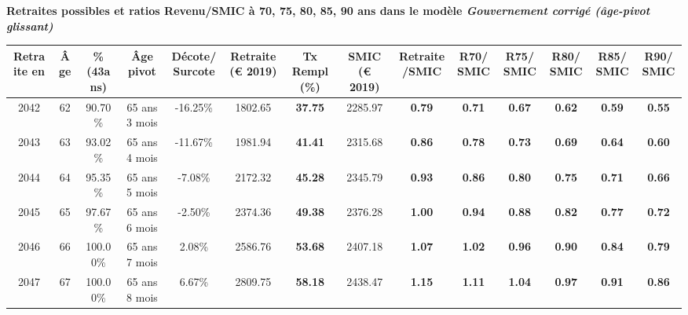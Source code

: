  \vspace{0.1cm} 
{\bf \noindent Retraites possibles et ratios Revenu/SMIC à 70, 75, 80, 85, 90 ans dans le modèle \emph{Gouvernement corrigé (âge-pivot glissant)}}  
 
\begin{adjustbox}{max width=\textwidth} 
\begin{tabular}[htb]{|c|c||c|c|c||c|c||c|c||c|c|c|c|c|} 
\hline 
 Retraite en &  Âge &  \%(43ans) &  Âge pivot &  Décote/Surcote &  Retraite (\euro{} 2019) &  Tx Rempl(\%) &  SMIC (\euro{} 2019) &  Retraite/SMIC &  R70/SMIC &  R75/SMIC &  R80/SMIC &  R85/SMIC &  R90/SMIC \\ 
\hline \hline 
 2042 &  62 &  90.70\% &  65 ans 3 mois &  -16.25\% &  1802.65 &  {\bf 37.75} &  2285.97 &  {\bf {\color{red} 0.79}} &  {\bf {\color{red} 0.71}} &  {\bf {\color{red} 0.67}} &  {\bf {\color{red} 0.62}} &  {\bf {\color{red} 0.59}} &  {\bf {\color{red} 0.55}} \\ 
\hline 
 2043 &  63 &  93.02\% &  65 ans 4 mois &  -11.67\% &  1981.94 &  {\bf 41.41} &  2315.68 &  {\bf {\color{red} 0.86}} &  {\bf {\color{red} 0.78}} &  {\bf {\color{red} 0.73}} &  {\bf {\color{red} 0.69}} &  {\bf {\color{red} 0.64}} &  {\bf {\color{red} 0.60}} \\ 
\hline 
 2044 &  64 &  95.35\% &  65 ans 5 mois &  -7.08\% &  2172.32 &  {\bf 45.28} &  2345.79 &  {\bf {\color{red} 0.93}} &  {\bf {\color{red} 0.86}} &  {\bf {\color{red} 0.80}} &  {\bf {\color{red} 0.75}} &  {\bf {\color{red} 0.71}} &  {\bf {\color{red} 0.66}} \\ 
\hline 
 2045 &  65 &  97.67\% &  65 ans 6 mois &  -2.50\% &  2374.36 &  {\bf 49.38} &  2376.28 &  {\bf {\color{red} 1.00}} &  {\bf {\color{red} 0.94}} &  {\bf {\color{red} 0.88}} &  {\bf {\color{red} 0.82}} &  {\bf {\color{red} 0.77}} &  {\bf {\color{red} 0.72}} \\ 
\hline 
 2046 &  66 &  100.00\% &  65 ans 7 mois &  2.08\% &  2586.76 &  {\bf 53.68} &  2407.18 &  {\bf 1.07} &  {\bf 1.02} &  {\bf {\color{red} 0.96}} &  {\bf {\color{red} 0.90}} &  {\bf {\color{red} 0.84}} &  {\bf {\color{red} 0.79}} \\ 
\hline 
 2047 &  67 &  100.00\% &  65 ans 8 mois &  6.67\% &  2809.75 &  {\bf 58.18} &  2438.47 &  {\bf 1.15} &  {\bf 1.11} &  {\bf 1.04} &  {\bf {\color{red} 0.97}} &  {\bf {\color{red} 0.91}} &  {\bf {\color{red} 0.86}} \\ 
\hline 
\hline 
\end{tabular} 
\end{adjustbox} 
 
